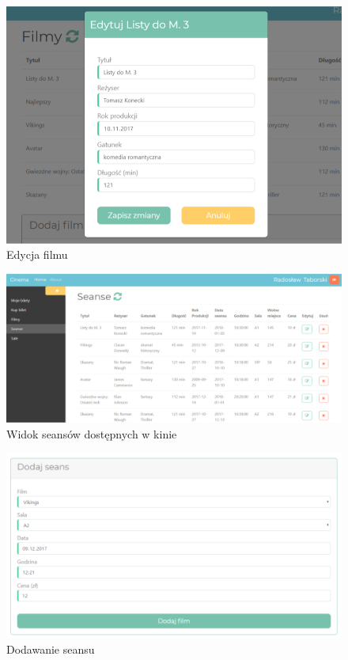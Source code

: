 \begin{figure} [H]
	\centering
	\includegraphics[width=1\linewidth]{rozdzial05/interfejs/edytujFilm.png}
	\caption{Edycja filmu}
	\label{fig:schem}
\end{figure}

\begin{figure} [H]
	\centering
	\includegraphics[width=1\linewidth]{rozdzial05/interfejs/seanse.png}
	\caption{Widok seansów dostępnych w kinie}
	\label{fig:schem}
\end{figure}

\begin{figure} [H]
	\centering
	\includegraphics[width=1\linewidth]{rozdzial05/interfejs/dodajSeans.png}
	\caption{Dodawanie seansu}
	\label{fig:schem}
\end{figure}

